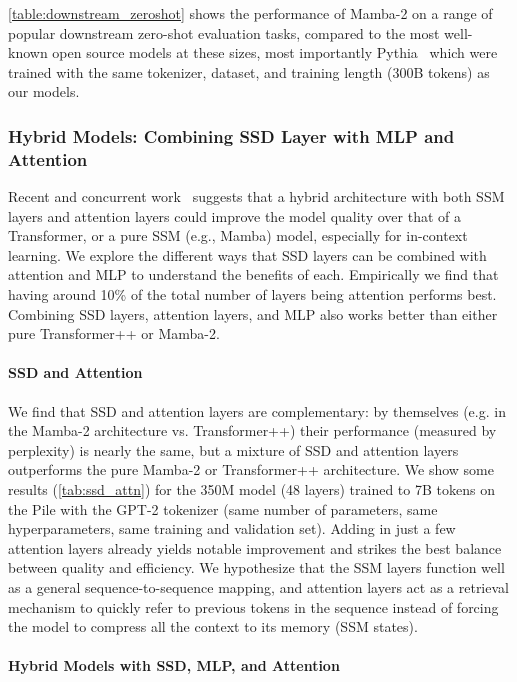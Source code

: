 \ref{table:downstream_zeroshot} shows the performance of Mamba-2 on a range of popular downstream zero-shot evaluation tasks, compared to the most well-known open source models at these sizes, most importantly Pythia~\citep{biderman2023pythia} which were trained with the same tokenizer, dataset, and training length (300B tokens) as our models.

\subsubsection{Hybrid Models: Combining SSD Layer with MLP and Attention}
\label{sec:hybrid}

Recent and concurrent work~\citep{dao2023hungry,de2024griffin,lieber2024jamba,glorioso2024zamba} suggests that a hybrid architecture with both SSM layers and attention layers could improve the model quality over that of a Transformer, or a pure SSM (e.g., Mamba) model, especially for in-context learning. We explore the different ways that SSD layers can be combined with attention and MLP to understand the benefits of each. Empirically we find that having around 10\% of the total number of layers being attention performs best. Combining SSD layers, attention layers, and MLP also works better than either pure Transformer++ or Mamba-2.

\paragraph{SSD and Attention} We find that SSD and attention layers are complementary: by themselves (e.g. in the Mamba-2 architecture vs. Transformer++) their performance (measured by perplexity) is nearly the same, but a mixture of SSD and attention layers outperforms the pure Mamba-2 or Transformer++ architecture. We show some results
(\ref{tab:ssd_attn}) for the 350M model (48 layers) trained to 7B tokens on the Pile with the GPT-2 tokenizer (same number of parameters, same hyperparameters, same training and validation set). Adding in just a few attention layers already yields notable improvement and strikes the best balance between quality and efficiency. We hypothesize that the SSM layers function well as a general sequence-to-sequence mapping, and attention layers act as a retrieval mechanism to quickly refer to previous tokens in the sequence instead of forcing the model to compress all the context to its memory (SSM states).

\paragraph{Hybrid Models with SSD, MLP, and Attention}

